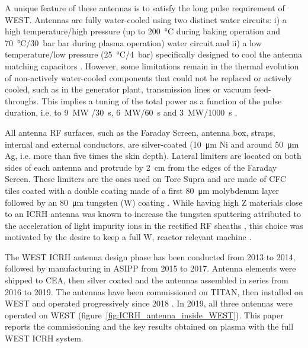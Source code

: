 \documentclass[12p]{iopart}
\begin{document}
A unique feature of these antennas is to satisfy the long pulse requirement of WEST. Antennas are fully water-cooled using two distinct water circuits: i) a high temperature/high pressure (up to \SI{200}{\celsius} during baking operation and \SI{70}{\celsius}/\SI{30}{\bar} bar during plasma operation) water circuit and ii) a low temperature/low pressure (\SI{25}{\celsius}/\SI{4}{\bar}) specifically designed to cool the antenna matching capacitors \cite{chen2015,vulliez2015}. However, some limitations remain in the thermal evolution of non-actively water-cooled components that could not be replaced or actively cooled, such as in the generator plant, transmission lines or vacuum feed-throughs. This implies a tuning of the total power as a function of the pulse duration, i.e. to \SI{9}{\mega\watt} /\SI{30}{\second}, \SI{6}{\mega\watt}/\SI{60}{\second} and \SI{3}{\mega\watt}/\SI{1000}{\second} \cite{hillairet2015-2}.

All antenna RF surfaces, such as the Faraday Screen, antenna box, straps, internal and external conductors, are silver-coated (\SI{10}{\micro\meter} Ni and around \SI{50}{\micro\meter} Ag, i.e. more than five times the skin depth). Lateral limiters are located on both sides of each antenna and protrude by \SI{2}{\centi\meter} from the edges of the Faraday Screen. These limiters are the ones used on Tore Supra and are made of CFC tiles coated with a double coating made of a first \SI{80}{\micro\meter} molybdenum layer followed by an \SI{80}{\micro\meter} tungsten (W) coating \cite{firdaouss2017-1, firdaouss2017}. While having high Z materials close to an ICRH antenna was known to increase the tungsten sputtering attributed to the acceleration of light impurity ions in the rectified RF sheaths \cite{bobkov2010}, this choice was motivated by the desire to keep a full W, reactor relevant machine \cite{bucalossi2014}.

The WEST ICRH antenna design phase has been conducted from 2013 to 2014, followed by manufacturing in ASIPP from 2015 to 2017. Antenna elements were shipped to CEA, then silver coated and the antennas assembled in series from 2016 to 2019. The antennas have been commissioned on TITAN, then installed on WEST and operated progressively since 2018 \cite{bernard2017, bernard2019, helou2020}. In 2019, all three antennas were operated on WEST (figure~\ref{fig:ICRH_antenna_inside_WEST}). This paper reports the commissioning and the key results obtained on plasma with the full WEST ICRH system.
\end{document}

